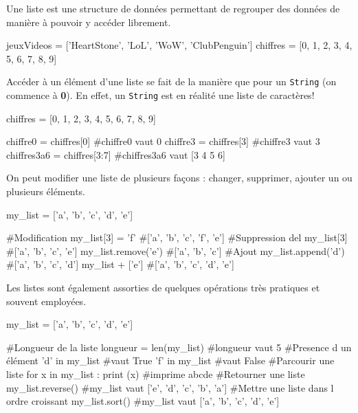 Une liste est une structure de données permettant de regrouper des données de manière à pouvoir y accéder librement.

\begin{python}[caption = Exemples de listes]
jeuxVideos = ['HeartStone', 'LoL', 'WoW', 'ClubPenguin']
chiffres = [0, 1, 2, 3, 4, 5, 6, 7, 8, 9]
\end{python}

Accéder à un élément d'une liste se fait de la manière que pour un \texttt{String} (on commence à \textbf{0}).
En effet, un \texttt{String} est en réalité une liste de caractères!

\begin{python}[caption = Accès à une liste]
chiffres = [0, 1, 2, 3, 4, 5, 6, 7, 8, 9]

chiffre0 = chiffres[0]      #chiffre0 vaut 0
chiffre3 = chiffres[3]      #chiffre3 vaut 3
chiffres3a6 = chiffres[3:7] #chiffres3a6 vaut [3 4 5 6]
\end{python}

On peut modifier une liste de plusieurs façons : changer, supprimer, ajouter un ou plusieurs éléments.

\begin{python}[caption = Modification de liste]
my_list = ['a', 'b', 'c', 'd', 'e']

#Modification
my_list[3] = 'f'    #['a', 'b', 'c', 'f', 'e']
#Suppression
del my_list[3]      #['a', 'b', 'c', 'e']
my_list.remove('e') #['a', 'b', 'c']
#Ajout
my_list.append('d') #['a', 'b', 'c', 'd']
my_list + ['e']     #['a', 'b', 'c', 'd', 'e']
\end{python}

Les listes sont également assorties de quelques opérations très pratiques et souvent employées.

\begin{python}[caption = Opérations sur les listes]
my_list = ['a', 'b', 'c', 'd', 'e']

#Longueur de la liste
longueur = len(my_list)  #longueur vaut 5
#Presence d un élément
'd' in my_list #vaut True 
'f' in my_list #vaut False
#Parcourir une liste
for x in my_list : print (x) #imprime abcde
#Retourner une liste
my_list.reverse() #my_list vaut ['e', 'd', 'c', 'b', 'a']
#Mettre une liste dans l ordre croissant
my_list.sort() #my_list vaut ['a', 'b', 'c', 'd', 'e']
\end{python}